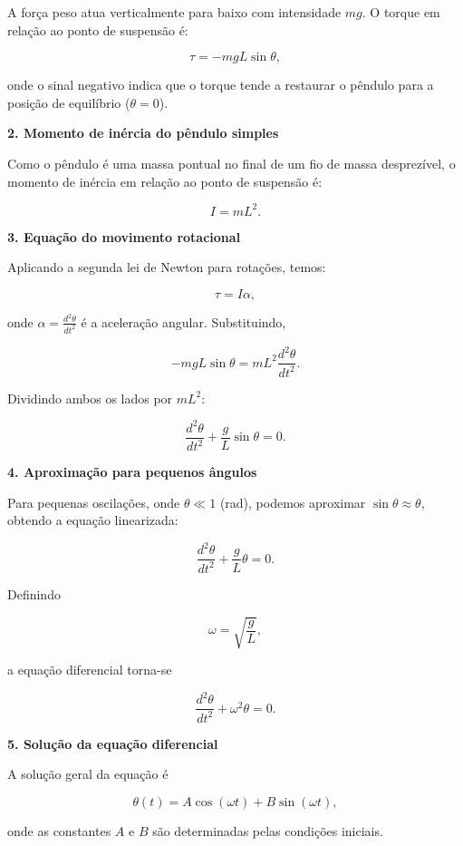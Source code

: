 \begin{flushleft}
A força peso atua verticalmente para baixo com intensidade \(mg\). O torque em relação ao ponto de suspensão é:

\[
\boxed{\tau = - m g L \sin\theta,}
\]

onde o sinal negativo indica que o torque tende a restaurar o pêndulo para a posição de equilíbrio (\(\theta = 0\)).

\bigskip

\textbf{2. Momento de inércia do pêndulo simples}

Como o pêndulo é uma massa pontual no final de um fio de massa desprezível, o momento de inércia em relação ao ponto de suspensão é:

\[
\boxed{I = m L^2.}
\]

\bigskip

\textbf{3. Equação do movimento rotacional}

Aplicando a segunda lei de Newton para rotações, temos:

\[
\boxed{\tau = I \alpha,}
\]

onde \(\alpha = \frac{d^2 \theta}{dt^2}\) é a aceleração angular. Substituindo,

\[
- m g L \sin\theta = m L^2 \frac{d^2 \theta}{dt^2}.
\]

Dividindo ambos os lados por \(m L^2\):

\[
\boxed{\frac{d^2 \theta}{dt^2} + \frac{g}{L} \sin\theta = 0.}
\]

\bigskip

\textbf{4. Aproximação para pequenos ângulos}

Para pequenas oscilações, onde \(\theta \ll 1\) (rad), podemos aproximar \(\sin\theta \approx \theta\), obtendo a equação linearizada:

\[
\boxed{\frac{d^2 \theta}{dt^2} + \frac{g}{L} \theta = 0.}
\]

Definindo

\[
\omega = \sqrt{\frac{g}{L}},
\]

a equação diferencial torna-se

\[
\boxed{\frac{d^2 \theta}{dt^2} + \omega^2 \theta = 0.}
\]

\bigskip

\textbf{5. Solução da equação diferencial}

A solução geral da equação é

\[
\boxed{\theta(t) = A \cos(\omega t) + B \sin(\omega t),}
\]

onde as \colorbox{green!30}{constantes \(A\) e \(B\) são determinadas pelas condições iniciais.}


\end{flushleft}
